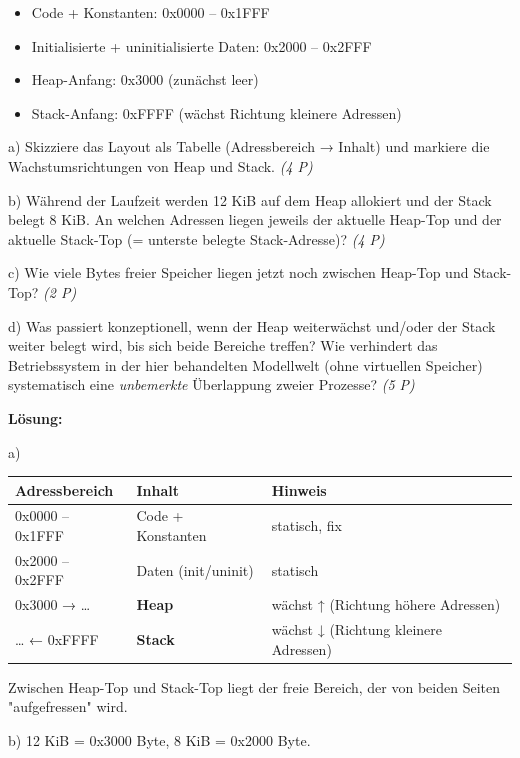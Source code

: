 \documentclass[11pt, a4paper]{article}
\begin{document}
\begin{itemize}
  \item Code + Konstanten: 0x0000 – 0x1FFF
  \item Initialisierte + uninitialisierte Daten: 0x2000 – 0x2FFF
  \item Heap-Anfang: 0x3000 (zunächst leer)
  \item Stack-Anfang: 0xFFFF (wächst Richtung kleinere Adressen)
\end{itemize}

a) Skizziere das Layout als Tabelle (Adressbereich → Inhalt) und markiere die Wachstumsrichtungen von Heap und Stack. \textit{(4 P)}


b) Während der Laufzeit werden 12 KiB auf dem Heap allokiert und der Stack belegt 8 KiB. An welchen Adressen liegen jeweils der aktuelle Heap-Top und der aktuelle Stack-Top (= unterste belegte Stack-Adresse)? \textit{(4 P)}


c) Wie viele Bytes freier Speicher liegen jetzt noch zwischen Heap-Top und Stack-Top? \textit{(2 P)}


d) Was passiert konzeptionell, wenn der Heap weiterwächst und/oder der Stack weiter belegt wird, bis sich beide Bereiche treffen? Wie verhindert das Betriebssystem in der hier behandelten Modellwelt (ohne virtuellen Speicher) systematisch eine \textit{unbemerkte} Überlappung zweier Prozesse? \textit{(5 P)}


\textbf{Lösung:}


a)



{\small
\begin{tabularx}{\linewidth}{XXX}
\hline
\rowcolor{tableheadbg}
{\color{white}\textbf{Adressbereich}} & {\color{white}\textbf{Inhalt}} & {\color{white}\textbf{Hinweis}} \\[2pt]
\hline
\endhead
\hline
\endfoot
0x0000 – 0x1FFF & Code + Konstanten & statisch, fix \\
0x2000 – 0x2FFF & Daten (init/uninit) & statisch \\
0x3000 → … & \textbf{Heap} & wächst ↑ (Richtung höhere Adressen) \\
… ← 0xFFFF & \textbf{Stack} & wächst ↓ (Richtung kleinere Adressen) \\
\end{tabularx}
}


Zwischen Heap-Top und Stack-Top liegt der freie Bereich, der von beiden Seiten "aufgefressen" wird.


b) 12 KiB = 0x3000 Byte, 8 KiB = 0x2000 Byte.
\end{document}
